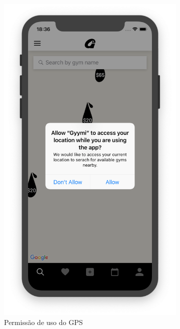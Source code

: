 \begin{figure}[H]
	\centering
    \begin{subfigure}[b]{0.38\textwidth}
        \includegraphics[width=\textwidth]{pfc/figuras/gps-permission.png}
        \caption{Permissão de uso do GPS}
        \label{fig:gps-permission}
    \end{subfigure}
    ~
	\begin{subfigure}[b]{0.4\textwidth}

\end{subfigure}
\end{figure}

